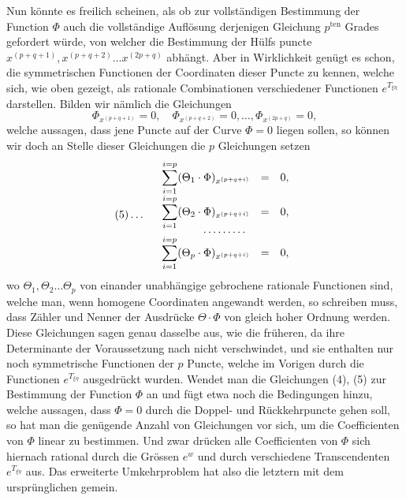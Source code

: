 \documentclass[10pt]{article}
\begin{document}
Nun könnte es freilich scheinen, als ob zur vollständigen Bestimmung der Function \(\Phi\) auch die vollständige Auflösung derjenigen Gleichung \(p^{\mathrm{ten}}\) Grades gefordert würde, von welcher die Bestimmung der Hülfs puncte \(x^{(p+q+1)},x^{(p+q+2)}\ldots x^{(2p+q)}\) abhängt. Aber in Wirklichkeit genügt es schon, die symmetrischen Functionen der Coordinaten dieser Puncte zu kennen, welche sich, wie oben gezeigt, als rationale Combinationen verschiedener Functionen \(e^{T_{\xi\eta}}\) darstellen. Bilden wir nämlich die Gleichungen
\[
\Phi_{x^{(p+q+1)}}=0,\quad
\Phi_{x^{(p+q+2)}}=0,\ldots,
\Phi_{x^{(2p+q)}}=0,
\]
welche aussagen, dass jene Puncte auf der Curve \(\Phi=0\) liegen sollen, so können wir doch an Stelle dieser Gleichungen die \(p\) Gleichungen setzen
\[
(5)\ldots\quad
\begin{array}{rcl}
\displaystyle\sum_{i=1}^{i=p}(\Theta_1\cdot\Phi)_{x^{(p+q+i)}}&=&0,\\
\displaystyle\sum_{i=1}^{i=p}(\Theta_2\cdot\Phi)_{x^{(p+q+i)}}&=&0,\\[-0.3em]
\multicolumn{3}{c}{\cdots\cdots\cdots}\\[-0.3em]
\displaystyle\sum_{i=1}^{i=p}(\Theta_p\cdot\Phi)_{x^{(p+q+i)}}&=&0,
\end{array}
\]
wo \(\Theta_1,\Theta_2\ldots\Theta_p\) von einander unabhängige gebrochene rationale Functionen sind, welche man, wenn homogene Coordinaten angewandt werden, so schreiben muss, dass Zähler und Nenner der Ausdrücke \(\Theta\cdot\Phi\) von gleich hoher Ordnung werden. Diese Gleichungen sagen genau dasselbe aus, wie die früheren, da ihre Determinante der Voraussetzung nach nicht verschwindet, und sie enthalten nur noch symmetrische Functionen der \(p\) Puncte, welche im Vorigen durch die Functionen \(e^{T_{\xi\eta}}\) ausgedrückt wurden. Wendet man die Gleichungen (4), (5) zur Bestimmung der Function \(\Phi\) an und fügt etwa noch die Bedingungen hinzu, welche aussagen, dass \(\Phi=0\) durch die Doppel- und Rückkehrpuncte gehen soll, so hat man die genügende Anzahl von Gleichungen vor sich, um die Coefficienten von \(\Phi\) linear zu bestimmen. Und zwar drücken alle Coefficienten von \(\Phi\) sich hiernach rational durch die Grössen \(e^w\) und durch verschiedene Transcendenten \(e^{T_{\xi\eta}}\) aus. Das erweiterte Umkehrproblem hat also die letztern mit dem ursprünglichen gemein.
\end{document}
